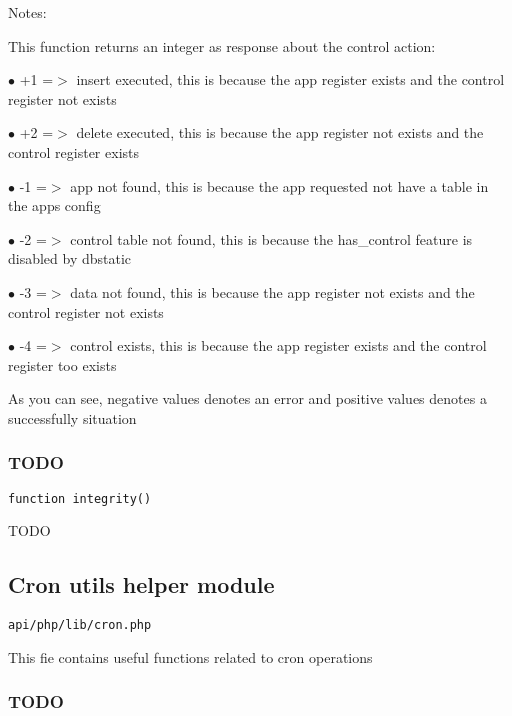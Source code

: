 \documentclass[a4paper]{article}
\begin{document}
Notes:

This function returns an integer as response about the control action:

\begin{compactitem}
\item[\color{myblue}$\bullet$] +1 =$>$ insert executed, this is because the app register exists and the control register not exists
\item[\color{myblue}$\bullet$] +2 =$>$ delete executed, this is because the app register not exists and the control register exists
\item[\color{myblue}$\bullet$] -1 =$>$ app not found, this is because the app requested not have a table in the apps config
\item[\color{myblue}$\bullet$] -2 =$>$ control table not found, this is because the has\_control feature is disabled by dbstatic
\item[\color{myblue}$\bullet$] -3 =$>$ data not found, this is because the app register not exists and the control register not exists
\item[\color{myblue}$\bullet$] -4 =$>$ control exists, this is because the app register exists and the control register too exists
\end{compactitem}

As you can see, negative values denotes an error and positive values denotes a successfully situation

\hypertarget{toc399}{}
\subsubsection{TODO}

\begin{lstlisting}
function integrity()
\end{lstlisting}

TODO

\hypertarget{toc400}{}
\subsection{Cron utils helper module}

\begin{lstlisting}
api/php/lib/cron.php
\end{lstlisting}

This fie contains useful functions related to cron operations

\hypertarget{toc401}{}
\subsubsection{TODO}
\end{document}
